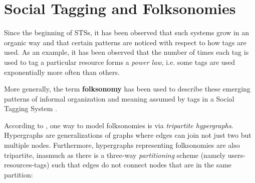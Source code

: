\section{Social Tagging and Folksonomies}\label{social_tagging_folksonomies}

Since the beginning of STSs, it has been observed that such systems grow in an organic way and that certain patterns are noticed with respect to how tags are used. As an example, it has been observed \citep{halpin_etal_2006} that the number of times each tag is used to tag a particular resource forms a \textit{power law}, i.e. some tags are used exponentially more often than others.

More generally, the term \textbf{folksonomy} has been used to describe  these emerging patterns of informal organization and meaning assumed by tags in a Social Tagging System \citep{mathes_2004,wal_2005_folksonomy}.

According to \cite{mika_2007}, one way to model folksonomies is via \textit{tripartite hypergraphs}. Hypergraphs are generalizations of graphs \citep{berge_1985} where edges can join not just two but multiple nodes. Furthermore, hypergraphs representing folksonomies are also tripartite, inasmuch as there is a three-way \textit{partitioning} scheme (namely users-resources-tags) such that edges do not connect nodes that are in the same partition:

